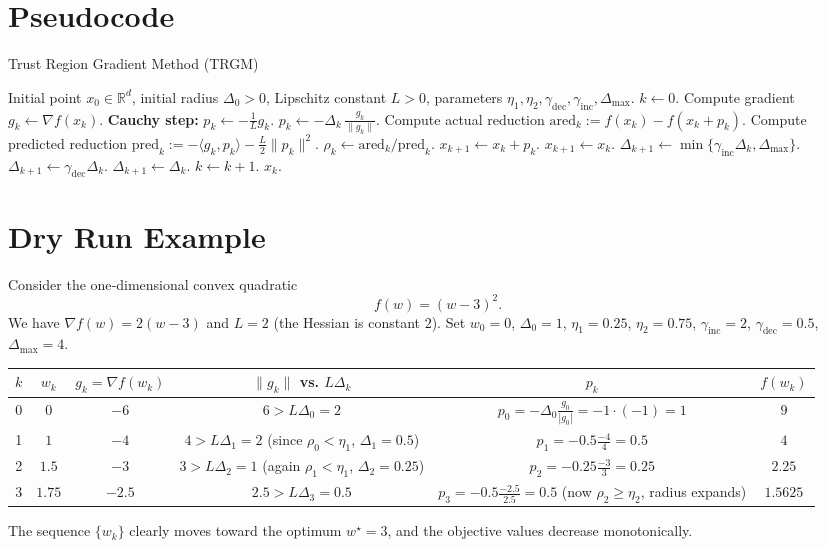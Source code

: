 \documentclass{article}
\begin{document}
\section*{Pseudocode}
\begin{algorithm}[H]
\caption{Trust Region Gradient Method (TRGM)}\label{alg:trgm}
\begin{algorithmic}[1]
\Require Initial point $x_0\in\mathbb{R}^d$, initial radius $\Delta_0>0$, 
Lipschitz constant $L>0$, parameters $\eta_1,\eta_2,\gamma_{\text{dec}},\gamma_{\text{inc}},\Delta_{\max}$.
\State $k\gets0$.
    \State Compute gradient $g_k\gets\nabla f(x_k)$.
    \State \textbf{Cauchy step:}
        \State $p_k\gets -\frac{1}{L}g_k$.
    \Else
        \State $p_k\gets -\Delta_k\,\frac{g_k}{\|g_k\|}$.
    \EndIf
    \State Compute actual reduction $\text{ared}_k:=f(x_k)-f(x_k+p_k)$.
    \State Compute predicted reduction 
    $\text{pred}_k:= -\langle g_k,p_k\rangle-\frac{L}{2}\|p_k\|^2$.
    \State $\rho_k\gets \text{ared}_k/\text{pred}_k$.
        \State $x_{k+1}\gets x_k+p_k$.
    \Else
        \State $x_{k+1}\gets x_k$.
    \EndIf
        \State $\Delta_{k+1}\gets \min\{\gamma_{\text{inc}}\Delta_k,\Delta_{\max}\}$.
        \State $\Delta_{k+1}\gets \gamma_{\text{dec}}\Delta_k$.
    \Else
        \State $\Delta_{k+1}\gets \Delta_k$.
    \EndIf
    \State $k\gets k+1$.
\EndWhile
\State \Return $x_k$.
\end{algorithmic}
\end{algorithm}

\section*{Dry Run Example}
Consider the one‑dimensional convex quadratic
\[
f(w)=(w-3)^2 .
\]
We have $\nabla f(w)=2(w-3)$ and $L=2$ (the Hessian is constant $2$).  
Set $w_0=0$, $\Delta_0=1$, $\eta_1=0.25$, $\eta_2=0.75$, $\gamma_{\text{inc}}=2$, $\gamma_{\text{dec}}=0.5$, $\Delta_{\max}=4$.

\begin{center}
\begin{tabular}{c|c|c|c|c|c}
$k$ & $w_k$ & $g_k= \nabla f(w_k)$ & $\|g_k\|$ vs. $L\Delta_k$ & $p_k$ & $f(w_k)$\\\hline
0 & $0$ & $-6$ & $6> L\Delta_0=2$ & $p_0=-\Delta_0\frac{g_0}{|g_0|}= -1\cdot(-1)=1$ & $9$\\
1 & $1$ & $-4$ & $4> L\Delta_1=2$ (since $\rho_0<\eta_1$, $\Delta_1=0.5$) & $p_1=-0.5\frac{-4}{4}=0.5$ & $4$\\
2 & $1.5$ & $-3$ & $3> L\Delta_2=1$ (again $\rho_1<\eta_1$, $\Delta_2=0.25$) & $p_2=-0.25\frac{-3}{3}=0.25$ & $2.25$\\
3 & $1.75$ & $-2.5$ & $2.5> L\Delta_3=0.5$ & $p_3=-0.5\frac{-2.5}{2.5}=0.5$ (now $\rho_2\ge\eta_2$, radius expands) & $1.5625$
\end{tabular}
\end{center}
The sequence $\{w_k\}$ clearly moves toward the optimum $w^\star=3$, and the objective values decrease monotonically.
\end{document}
